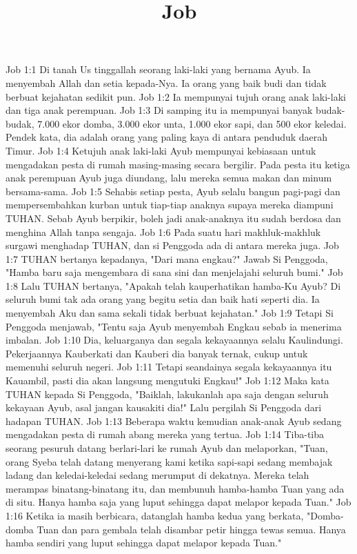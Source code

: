 

\title{Job}

Job 1:1  Di tanah Us tinggallah seorang laki-laki yang bernama Ayub. Ia menyembah Allah dan setia kepada-Nya. Ia orang yang baik budi dan tidak berbuat kejahatan sedikit pun.
Job 1:2  Ia mempunyai tujuh orang anak laki-laki dan tiga anak perempuan.
Job 1:3  Di samping itu ia mempunyai banyak budak-budak, 7.000 ekor domba, 3.000 ekor unta, 1.000 ekor sapi, dan 500 ekor keledai. Pendek kata, dia adalah orang yang paling kaya di antara penduduk daerah Timur.
Job 1:4  Ketujuh anak laki-laki Ayub mempunyai kebiasaan untuk mengadakan pesta di rumah masing-masing secara bergilir. Pada pesta itu ketiga anak perempuan Ayub juga diundang, lalu mereka semua makan dan minum bersama-sama.
Job 1:5  Sehabis setiap pesta, Ayub selalu bangun pagi-pagi dan mempersembahkan kurban untuk tiap-tiap anaknya supaya mereka diampuni TUHAN. Sebab Ayub berpikir, boleh jadi anak-anaknya itu sudah berdosa dan menghina Allah tanpa sengaja.
Job 1:6  Pada suatu hari makhluk-makhluk surgawi menghadap TUHAN, dan si Penggoda ada di antara mereka juga.
Job 1:7  TUHAN bertanya kepadanya, "Dari mana engkau?" Jawab Si Penggoda, "Hamba baru saja mengembara di sana sini dan menjelajahi seluruh bumi."
Job 1:8  Lalu TUHAN bertanya, "Apakah telah kauperhatikan hamba-Ku Ayub? Di seluruh bumi tak ada orang yang begitu setia dan baik hati seperti dia. Ia menyembah Aku dan sama sekali tidak berbuat kejahatan."
Job 1:9  Tetapi Si Penggoda menjawab, "Tentu saja Ayub menyembah Engkau sebab ia menerima imbalan.
Job 1:10  Dia, keluarganya dan segala kekayaannya selalu Kaulindungi. Pekerjaannya Kauberkati dan Kauberi dia banyak ternak, cukup untuk memenuhi seluruh negeri.
Job 1:11  Tetapi seandainya segala kekayaannya itu Kauambil, pasti dia akan langsung mengutuki Engkau!"
Job 1:12  Maka kata TUHAN kepada Si Penggoda, "Baiklah, lakukanlah apa saja dengan seluruh kekayaan Ayub, asal jangan kausakiti dia!" Lalu pergilah Si Penggoda dari hadapan TUHAN.
Job 1:13  Beberapa waktu kemudian anak-anak Ayub sedang mengadakan pesta di rumah abang mereka yang tertua.
Job 1:14  Tiba-tiba seorang pesuruh datang berlari-lari ke rumah Ayub dan melaporkan, "Tuan, orang Syeba telah datang menyerang kami ketika sapi-sapi sedang membajak ladang dan keledai-keledai sedang merumput di dekatnya. Mereka telah merampas binatang-binatang itu, dan membunuh hamba-hamba Tuan yang ada di situ. Hanya hamba saja yang luput sehingga dapat melapor kepada Tuan."
Job 1:16  Ketika ia masih berbicara, datanglah hamba kedua yang berkata, "Domba-domba Tuan dan para gembala telah disambar petir hingga tewas semua. Hanya hamba sendiri yang luput sehingga dapat melapor kepada Tuan."
